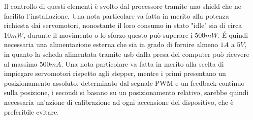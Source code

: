 \documentclass[12pt,twoside,openright]{report}
\begin{document}
Il controllo di questi elementi è svolto dal processore tramite uno shield che ne facilita l'installazione. Una nota particolare va fatta in merito alla potenza richiesta dai servomotori, nonostante il loro consumo in stato "idle" sia di circa $10mW$, durante il movimento o lo sforzo questo può superare i $500mW$. É quindi necessaria una alimentazione esterna che sia in grado di fornire almeno $1A$ a $5V$, in quanto la scheda alimentata tramite usb dalla presa del computer può ricevere al massimo $500mA$. Una nota particolare va fatta in merito alla scelta di impiegare servomotori rispetto agli stepper, mentre i primi presentano un posizionamento assoluto, determinato dal segnale PWM e un feedback continuo sulla posizione, i secondi si basano su un posizionamento relativo, sarebbe quindi necessaria un'azione di calibrazione ad ogni accensione del dispositivo, che è preferibile evitare.
\end{document}
